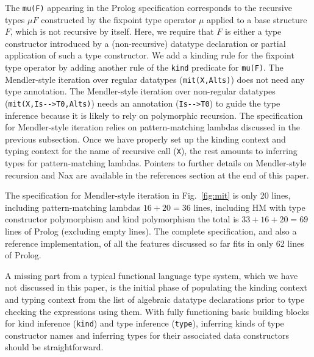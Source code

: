 \documentclass[runningheads,a4paper]{llncs}
\begin{document}

The \verb|mu(F)| appearing in the Prolog specification
corresponds to the recursive types $\mu F$
constructed by the fixpoint type operator $\mu$ applied to
a base structure $F$, which is not recursive by itself.
Here, we require that $F$ is either a type constructor introduced by
a (non-recursive) datatype declaration or partial application of
such a type constructor. We add a kinding rule for the fixpoint type
operator by adding another rule of the \verb|kind| predicate for \verb|mu(F)|.
The Mendler-style iteration over regular datatypes (\verb|mit(X,Alts)|)
does not need any type annotation. The Mendler-style iteration over
non-regular datatypes (\verb|mit(X,Is-->T0,Alts)|) needs an annotation
(\verb|Is-->T0|) to guide the type inference because it is likely to rely on
polymorphic recursion. The specification for Mendler-style iteration relies on
pattern-matching lambdas discussed in the previous subsection. Once we have
properly set up the kinding context and typing context for the name of
recursive call (\verb|X|), the rest amounts to inferring types for
pattern-matching lambdas.
Pointers to further details on Mendler-style recursion
\cite{vene00phd,AbeMatUus03,AhnShe11} and Nax \cite{Ahn14thesis}
are available in the references section at the end of this paper.

The specification for Mendler-style iteration in Fig.~\ref{fig:mit}
is only 20 lines, including pattern-matching lambdas $16+20=36$ lines,
including HM with type constructor polymorphism and kind polymorphism
the total is $33+16+20=69$ lines of Prolog (excluding empty lines).
The complete specification, and also a reference implementation, of
all the features discussed so far fits in only 62 lines of Prolog.

A missing part from a typical functional language type system, which
we have not discussed in this paper, is the initial phase of populating
the kinding context and typing context from the list of algebraic datatype
declarations prior to type checking the expressions using them.
With fully functioning basic building blocks for kind inference
(\verb|kind|) and type inference (\verb|type|), inferring kinds of
type constructor names and inferring types for their associated
data constructors should be straightforward.
\end{document}
